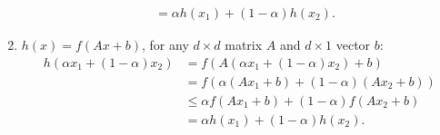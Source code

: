 \documentclass{article}
\begin{document}
\begin{enumerate}
\begin{align*}
	 &= \alpha h(x_1) + (1-\alpha) h(x_2).
	\end{align*}
	\item $h(x) = f(Ax + b)$, for any $d\times d$ matrix $A$ and $d\times 1$ vector $b$:
	\begin{align*}
	h(\alpha x_1 + (1-\alpha)x_2) &= f(A(\alpha x_1 + (1-\alpha)x_2) + b)\\
	 &= f( \alpha ( Ax_1 + b ) + (1-\alpha) ( Ax_2 + b ) )\\
	 &\leq \alpha f(Ax_1 + b) + (1-\alpha) f(Ax_2 + b)\\
	 &= \alpha h(x_1) + (1-\alpha) h(x_2).
	\end{align*}
  \end{enumerate}
\end{document}
